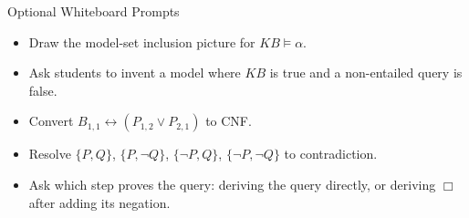 \documentclass[aspectratio=169,11pt]{beamer}
\begin{document}
\begin{frame}{Optional Whiteboard Prompts}
  \begin{itemize}
    \item Draw the model-set inclusion picture for $KB \models \alpha$.
    \item Ask students to invent a model where $KB$ is true and a non-entailed query is false.
    \item Convert $B_{1,1} \leftrightarrow (P_{1,2} \lor P_{2,1})$ to CNF.
    \item Resolve $\{P,Q\}$, $\{P,\neg Q\}$, $\{\neg P,Q\}$, $\{\neg P,\neg Q\}$ to contradiction.
    \item Ask which step proves the query: deriving the query directly, or deriving $\Box$ after adding its negation.
  \end{itemize}
\end{frame}
\end{document}
